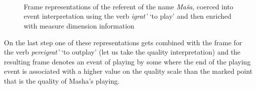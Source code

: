 \begin{figure}
\begin{minipage}{0.45\textwidth}
\\

\\
\end{minipage}
\hfill
\begin{minipage}{0.45\textwidth}
\\
\end{minipage}
\caption{Frame representations of the referent of the name \textit{Ma\v{s}a}, coerced into event interpretation using the verb \textit{igrat'} `to play' and then enriched with measure dimension information \label{frame:Masha:play}}
\end{figure}

On the last step one of these representations gets combined with the frame for the verb \textit{pereigrat'} `to outplay' (let us take the quality interpretation) and the resulting frame denotes an event of playing by some \ACTOR  where the end of the playing event is associated with a higher value on the quality scale than the marked point that is the quality of Masha's playing.

